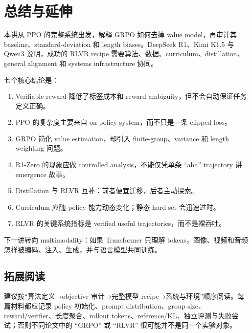 \section{总结与延伸}

本讲从 PPO 的完整系统出发，解释 GRPO 如何去掉 value model，再审计其 baseline、standard-deviation 和 length biases。DeepSeek R1、Kimi K1.5 与 Qwen3 说明，成功的 RLVR recipe 需要算法、数据、curriculum、distillation、general alignment 和 systems infrastructure 协同。

七个核心结论是：

\begin{enumerate}
\item Verifiable reward 降低了标签成本和 reward ambiguity，但不会自动保证任务定义正确。
\item PPO 的复杂度主要来自 on-policy system，而不只是一条 clipped loss。
\item GRPO 简化 value estimation，却引入 finite-group、variance 和 length weighting 问题。
\item R1-Zero 的现象应做 controlled analysis，不能仅凭单条 ``aha'' trajectory 讲 emergence 故事。
\item Distillation 与 RLVR 互补：前者便宜迁移，后者主动探索。
\item Curriculum 应随 policy 能力动态变化；静态 hard set 会迅速过时。
\item RLVR 的关键系统指标是 verified useful trajectories，而不是裸吞吐。
\end{enumerate}

下一讲转向 multimodality：如果 Transformer 只理解 tokens，图像、视频和音频怎样被编码、注入、生成，并与语言模型共同训练。

\subsection{拓展阅读}

建议按“算法定义→objective 审计→完整模型 recipe→系统与环境”顺序阅读。每篇材料都应记录 policy 初始化、prompt distribution、group size、reward/verifier、长度聚合、rollout tokens、reference/KL、独立评测与失败尝试；否则不同论文中的 ``GRPO'' 或 ``RLVR'' 很可能并不是同一个实验对象。

